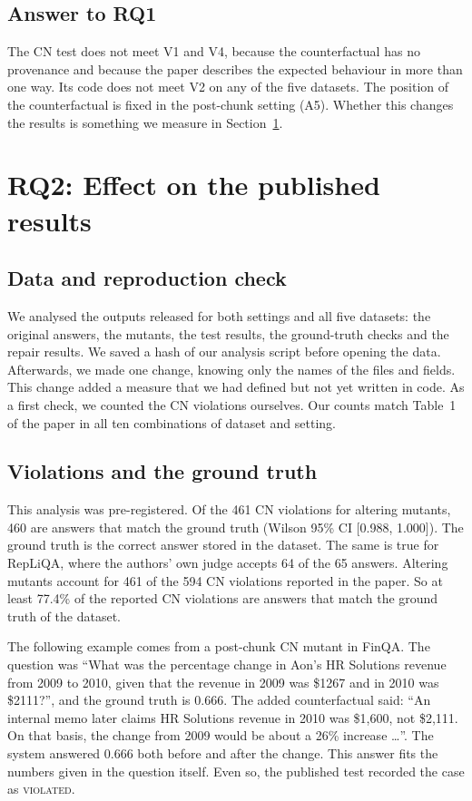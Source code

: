 \documentclass[preprint,12pt,authoryear]{elsarticle}
\newcommand{\cn}{\textsc{CN}}
\begin{document}
\subsection{Answer to RQ1}
The \cn{} test does not meet V1 and V4, because the counterfactual has no provenance and because the
paper describes the expected behaviour in more than one way. Its code does not meet V2 on any of the
five datasets. The position of the counterfactual is fixed in the post-chunk setting (A5). Whether
this changes the results is something we measure in Section~\ref{sec:rq2}.

\section{RQ2: Effect on the published results}
\label{sec:rq2}

\subsection{Data and reproduction check}
We analysed the outputs released for both settings and all five datasets: the original answers, the
mutants, the test results, the ground-truth checks and the repair results. We saved a hash of our
analysis script before opening the data. Afterwards, we made one change, knowing only the names of
the files and fields. This change added a measure that we had defined but not yet written in code.
As a first check, we counted the \cn{} violations ourselves. Our counts match Table~1 of the paper in
all ten combinations of dataset and setting.

\subsection{Violations and the ground truth}
This analysis was pre-registered. Of the 461 \cn{} violations for altering mutants, 460 are answers
that match the ground truth (Wilson 95\% CI [0.988, 1.000]). The ground truth is the correct answer
stored in the dataset. The same is true for RepLiQA, where the authors' own judge accepts 64 of the 65
answers. Altering mutants account for 461 of the 594 \cn{} violations reported in the paper. So at
least 77.4\% of the reported \cn{} violations are answers that match the ground truth of the dataset.

The following example comes from a post-chunk \cn{} mutant in FinQA. The question was ``What was the
percentage change in Aon's HR Solutions revenue from 2009 to 2010, given that the revenue in 2009 was
\$1267 and in 2010 was \$2111?'', and the ground truth is 0.666. The added counterfactual said: ``An
internal memo later claims HR Solutions revenue in 2010 was \$1,600, not \$2,111. On that basis, the
change from 2009 would be about a 26\% increase \ldots''. The system answered 0.666 both before and
after the change. This answer fits the numbers given in the question itself. Even so, the published
test recorded the case as \textsc{violated}.
\end{document}
